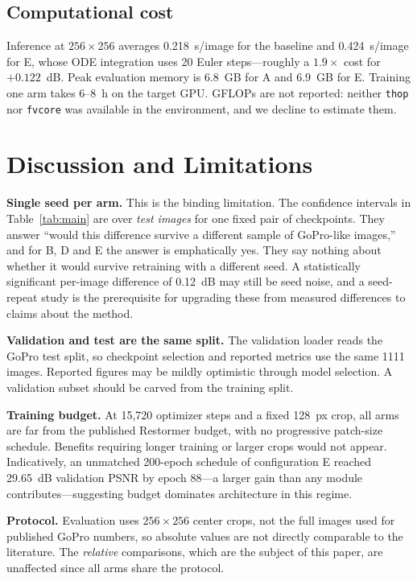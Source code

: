 \documentclass[conference]{IEEEtran}
\newcommand{\bs}[1]{\textbf{#1}}
\begin{document}
\subsection{Computational cost}
Inference at $256\times256$ averages 0.218~s/image for the baseline and
0.424~s/image for E, whose ODE integration uses 20 Euler steps---roughly a
$1.9\times$ cost for $+0.122$~dB. Peak evaluation memory is 6.8~GB for A and
6.9~GB for E. Training one arm takes 6--8~h on the target GPU. GFLOPs are not
reported: neither \texttt{thop} nor \texttt{fvcore} was available in the
environment, and we decline to estimate them.

\section{Discussion and Limitations}
\label{sec:limitations}

\bs{Single seed per arm.} This is the binding limitation. The confidence
intervals in Table~\ref{tab:main} are over \emph{test images} for one fixed
pair of checkpoints. They answer ``would this difference survive a different
sample of GoPro-like images,'' and for B, D and E the answer is emphatically
yes. They say nothing about whether it would survive retraining with a
different seed. A statistically significant per-image difference of 0.12~dB may
still be seed noise, and a seed-repeat study is the prerequisite for upgrading
these from measured differences to claims about the method.

\bs{Validation and test are the same split.} The validation loader reads the
GoPro test split, so checkpoint selection and reported metrics use the same
1111 images. Reported figures may be mildly optimistic through model selection.
A validation subset should be carved from the training split.

\bs{Training budget.} At 15{,}720 optimizer steps and a fixed 128~px crop, all
arms are far from the published Restormer budget, with no progressive
patch-size schedule. Benefits requiring longer training or larger crops would
not appear. Indicatively, an unmatched 200-epoch schedule of configuration E
reached 29.65~dB validation PSNR by epoch 88---a larger gain than any module
contributes---suggesting budget dominates architecture in this regime.

\bs{Protocol.} Evaluation uses $256\times256$ center crops, not the full images
used for published GoPro numbers, so absolute values are not directly
comparable to the literature. The \emph{relative} comparisons, which are the
subject of this paper, are unaffected since all arms share the protocol.
\end{document}
